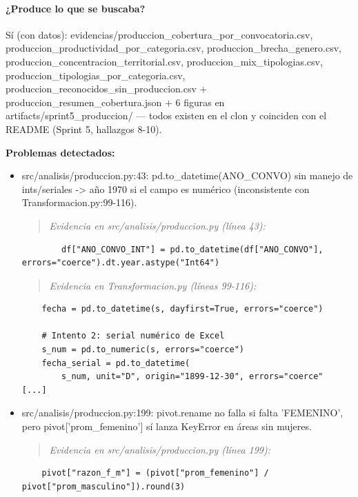 \paragraph{¿Produce lo que se buscaba?}
Sí (con datos): evidencias/produccion\_cobertura\_por\_convocatoria.csv, produccion\_productividad\_por\_categoria.csv, produccion\_brecha\_genero.csv, produccion\_concentracion\_territorial.csv, produccion\_mix\_tipologias.csv, produccion\_tipologias\_por\_categoria.csv, produccion\_reconocidos\_sin\_produccion.csv + produccion\_resumen\_cobertura.json + 6 figuras en artifacts/sprint5\_produccion/ --- todos existen en el clon y coinciden con el README (Sprint 5, hallazgos 8-10).

\begin{tcolorbox}[riesgo]
\textbf{Problemas detectados:}
\begin{itemize}
  \item src/analisis/produccion.py:43: pd.to\_datetime(ANO\_CONVO) sin manejo de ints/seriales -> año 1970 si el campo es numérico (inconsistente con Transformacion.py:99-116).
\begin{quote}\footnotesize\ttfamily
\noindent\emph{Evidencia en src/analisis/produccion.py (línea 43):}
\end{quote}
\begin{lstlisting}
        df["ANO_CONVO_INT"] = pd.to_datetime(df["ANO_CONVO"], errors="coerce").dt.year.astype("Int64")
\end{lstlisting}

\begin{quote}\footnotesize\ttfamily
\noindent\emph{Evidencia en Transformacion.py (líneas 99-116):}
\end{quote}
\begin{lstlisting}
    fecha = pd.to_datetime(s, dayfirst=True, errors="coerce")

    # Intento 2: serial numérico de Excel
    s_num = pd.to_numeric(s, errors="coerce")
    fecha_serial = pd.to_datetime(
        s_num, unit="D", origin="1899-12-30", errors="coerce"
[...]
\end{lstlisting}

  \item src/analisis/produccion.py:199: pivot.rename no falla si falta 'FEMENINO', pero pivot['prom\_femenino'] sí lanza KeyError en áreas sin mujeres.
\begin{quote}\footnotesize\ttfamily
\noindent\emph{Evidencia en src/analisis/produccion.py (línea 199):}
\end{quote}
\begin{lstlisting}
    pivot["razon_f_m"] = (pivot["prom_femenino"] / pivot["prom_masculino"]).round(3)
\end{lstlisting}


\end{itemize}
\end{tcolorbox}
